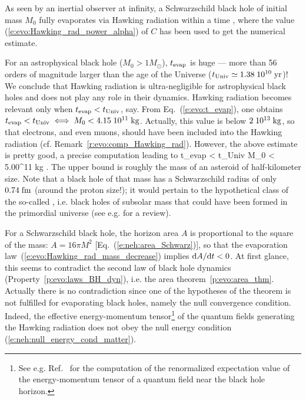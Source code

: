 \begin{prop}
As seen by an inertial observer at infinity, a Schwarzschild black hole of initial mass $M_0$ fully evaporates via Hawking radiation within a time
\be \label{e:evo:t_evap}
     ,
\ee
where the value (\ref{e:evo:Hawking_rad_power_alpha}) of $C$ has been used
to get the numerical estimate.
\end{prop}

For an astrophysical black hole ($M_0 >  1 M_\odot$), $t_{\rm evap} $ is
huge --- more than 56
orders of magnitude larger than the age of the Universe ($t_{\rm Univ} \simeq 1.38\; 10^{10} {\rm\; yr}$)!
We conclude that Hawking radiation is ultra-negligible
for astrophysical black holes and
does not play any role in their dynamics. Hawking radiation becomes relevant only when
$t_{\rm evap} < t_{\rm Univ}$, say. From Eq.~(\ref{e:evo:t_evap}), one obtains
$t_{\rm evap} < t_{\rm Univ} \iff M_0 < 4.15\; 10^{11} {\rm\; kg}$. Actually, this value
is below $2\; 10^{13}{\rm\; kg}$, so that electrons, and even muons, should have been included into the Hawking radiation
(cf. Remark~\ref{r:evo:comp_Hawking_rad}). However, the above estimate is pretty good, a precise computation leading to \cite{MacGiCP08}
\be
    t_{\rm evap} < t_{\rm Univ} \iff M_0 < 5.00^{11} {\rm\; kg} .
\ee
The upper bound is roughly the mass of an asteroid of half-kilometer size.
Note that a black hole of that mass has a Schwarzschild radius
of only $0.74{\rm \; fm}$ (around the proton size!); it
would pertain to the hypothetical class
of the so-called
,
i.e. black holes of subsolar mass that could have been formed in the primordial universe
(see e.g. \cite{CarrKSY21} for a review).

\begin{remark}
For a Schwarzschild black hole, the horizon area $A$ is proportional to the square
of the mass: $A = 16\pi M^2$ [Eq.~(\ref{e:neh:area_Schwarz})], so that
the evaporation law~(\ref{e:evo:Hawking_rad_mass_decrease}) implies $\mathrm{d} A / \mathrm{d} t < 0$.
At first glance,  this seems to contradict the second law of black hole dynamics
(Property~\ref{p:evo:laws_BH_dyn}), i.e. the
area theorem~\ref{p:evo:area_thm}.
Actually there is no contradiction since one of the hypotheses of
the theorem is not fulfilled for evaporating black holes, namely
the null convergence condition. Indeed, the effective energy-momentum tensor\footnote{See e.g.
Ref.~\cite{FroloT89} for the computation of the renormalized expectation value of the energy-momentum tensor of a quantum field near the black hole horizon.}
of the quantum fields generating the Hawking radiation does not obey the
null energy condition (\ref{e:neh:null_energy_cond_matter}).
\end{remark}

